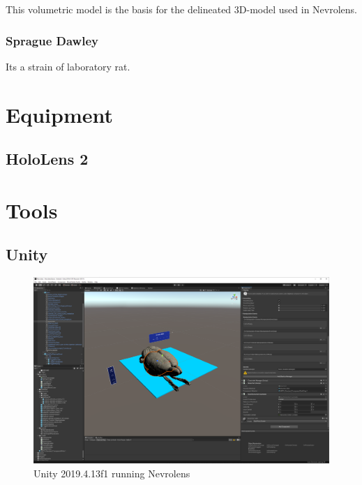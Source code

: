 This volumetric model is the basis for the delineated 3D-model used in Nevrolens.


\subsubsection*{Sprague Dawley}

Its a strain of laboratory rat.




\section{Equipment}

\subsection*{HoloLens 2}


\section{Tools}\label{chap:tools}


\subsection*{Unity}\label{chap:unity}

\begin{figure}
    \centering
    \includegraphics[width=\textwidth]{fig/unity_example.png}
    \caption{Unity 2019.4.13f1 running Nevrolens}
\end{figure}


